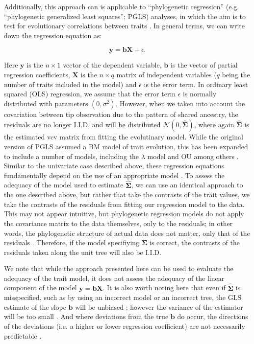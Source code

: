 \documentclass[12pt]{article}
\begin{document}
Additionally, this approach can is applicable to ``phylogenetic regression'' (e.g. ``phylogenetic generalized least squares''; PGLS) analyses, in which the aim is to test for evolutionary correlations between traits \citep{Grafen1989, Rohlf2001}. In general terms, we can write down the regression equation as:

\begin{equation}
\mathbf{y} = \mathbf{b}\mathbf{X} + \epsilon .
\end{equation} 

Here $\mathbf{y}$ is the $n \times 1$ vector of the dependent variable, $\mathbf{b}$ is the vector of partial regression coefficients, $\mathbf{X}$ is the $n \times q$ matrix of independent variables ($q$ being the number of traits included in the model) and $\epsilon$ is the error term. In ordinary least squared (OLS) regression, we assume that the error term $\epsilon$ is normally distributed with parameters $(0, \sigma^2)$. However, when we taken into account the covariation between tip observation due to the pattern of shared ancestry, the residuals are no longer I.I.D. and will be distributed $\mathcal{N} (0, \hat{\mathbf{\Sigma}})$, where again $\hat{\mathbf{\Sigma}}$ is the estimated vcv matrix from fitting the evolutinary model. While the original version of PGLS assumed a BM model of trait evolution, this has been expanded to include a number of models, including the $\lambda$ model \citep{Pagel1997, Freckleton2009, Revell2010} and OU \citep{Hansen2008, Labra2009, Bartoszek2012} among others \citep[see also][]{Lynch1991, Hadfield2010}. Similar to the univariate case described above, these regression equations fundamentally depend on the use of an appropriate model \citep{Hansen2012SysBio}. To assess the adequacy of the model used to estimate $\hat{\mathbf{\Sigma}}$, we can use an identical approach to the one described above, but rather that take the contrasts of the trait values, we take the contrasts of the residuals from fitting our regression model to the data. This may not appear intuitive, but phylogenetic regression models do not apply the covariance matrix to the data themselves, only to the residuals; in other words, the phylogenetic structure of actual data does not matter, only that of the residuals \citep{Rohlf2001}. Therefore, if the model specifiying $\mathbf{\Sigma}$ is correct, the contrasts of the residuals taken along the unit tree will also be I.I.D.

We note that while the approach presented here can be used to evaluate the adequacy of the trait model, it does not assess the adequacy of the linear component of the model $\mathbf{y} = \mathbf{b}\mathbf{X}$. It is also worth noting here that even if $\hat{\mathbf{\Sigma}}$ is misspecified, such as by using an incorrect model or an incorrect tree, the GLS estimate of the slope $\mathbf{b}$ will be unbiased \citep{Rao1999}; however the variance of the estimator will be too small \citep{Rohlf2006}. And where deviations from the true $\mathbf{b}$ do occur, the directions of the deviations (i.e. a higher or lower regression coefficient) are not necessarily predictable \citep{Rohlf2006}. 
\end{document}
